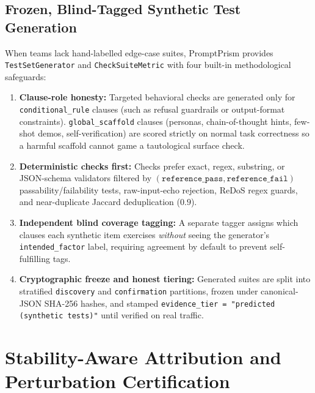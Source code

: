 \documentclass[11pt,a4paper]{article}
\newcommand{\method}{PromptPrism}
\begin{document}
\subsection{Frozen, Blind-Tagged Synthetic Test Generation}
When teams lack hand-labelled edge-case suites, \method{} provides \texttt{TestSetGenerator} and \texttt{CheckSuiteMetric} with four built-in methodological safeguards:
\begin{enumerate}[leftmargin=*,nosep]
    \item \textbf{Clause-role honesty:} Targeted behavioral checks are generated only for \texttt{conditional\_rule} clauses (such as refusal guardrails or output-format constraints). \texttt{global\_scaffold} clauses (personas, chain-of-thought hints, few-shot demos, self-verification) are scored strictly on normal task correctness so a harmful scaffold cannot game a tautological surface check.
    \item \textbf{Deterministic checks first:} Checks prefer exact, regex, substring, or JSON-schema validators filtered by $(\texttt{reference\_pass}, \texttt{reference\_fail})$ passability/failability tests, raw-input-echo rejection, ReDoS regex guards, and near-duplicate Jaccard deduplication ($0.9$).
    \item \textbf{Independent blind coverage tagging:} A separate tagger assigns which clauses each synthetic item exercises \emph{without} seeing the generator's \texttt{intended\_factor} label, requiring agreement by default to prevent self-fulfilling tags.
    \item \textbf{Cryptographic freeze and honest tiering:} Generated suites are split into stratified \texttt{discovery} and \texttt{confirmation} partitions, frozen under canonical-JSON SHA-256 hashes, and stamped \texttt{evidence\_tier = "predicted (synthetic tests)"} until verified on real traffic.
\end{enumerate}

\section{Stability-Aware Attribution and Perturbation Certification}
\label{sec:stability_upgrades}
\end{document}
